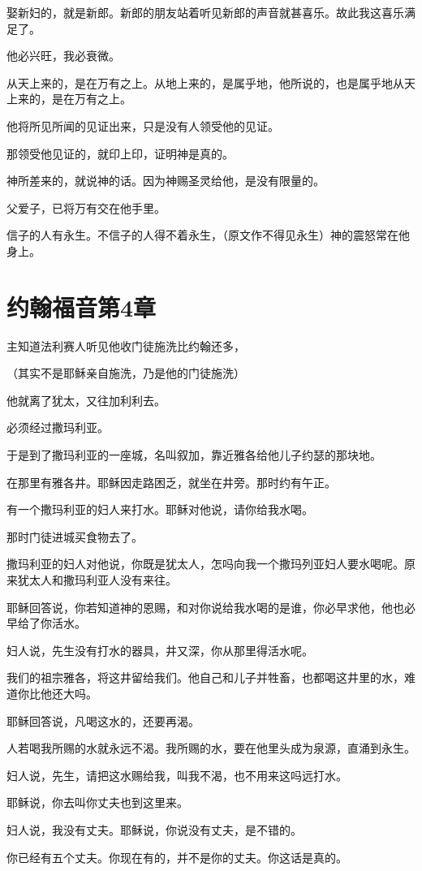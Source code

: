 \documentclass[12pt,oneside]{book}
\begin{document}
娶新妇的，就是新郎。新郎的朋友站着听见新郎的声音就甚喜乐。故此我这喜乐满足了。

他必兴旺，我必衰微。

从天上来的，是在万有之上。从地上来的，是属乎地，他所说的，也是属乎地从天上来的，是在万有之上。

他将所见所闻的见证出来，只是没有人领受他的见证。

那领受他见证的，就印上印，证明神是真的。

神所差来的，就说神的话。因为神赐圣灵给他，是没有限量的。

父爱子，已将万有交在他手里。

信子的人有永生。不信子的人得不着永生，（原文作不得见永生）神的震怒常在他身上。

\chapter{约翰福音第4章}
主知道法利赛人听见他收门徒施洗比约翰还多，

（其实不是耶稣亲自施洗，乃是他的门徒施洗）

他就离了犹太，又往加利利去。

必须经过撒玛利亚。

于是到了撒玛利亚的一座城，名叫叙加，靠近雅各给他儿子约瑟的那块地。

在那里有雅各井。耶稣因走路困乏，就坐在井旁。那时约有午正。

有一个撒玛利亚的妇人来打水。耶稣对他说，请你给我水喝。

那时门徒进城买食物去了。

撒玛利亚的妇人对他说，你既是犹太人，怎吗向我一个撒玛列亚妇人要水喝呢。原来犹太人和撒玛利亚人没有来往。

耶稣回答说，你若知道神的恩赐，和对你说给我水喝的是谁，你必早求他，他也必早给了你活水。

妇人说，先生没有打水的器具，井又深，你从那里得活水呢。

我们的祖宗雅各，将这井留给我们。他自己和儿子并牲畜，也都喝这井里的水，难道你比他还大吗。

耶稣回答说，凡喝这水的，还要再渴。

人若喝我所赐的水就永远不渴。我所赐的水，要在他里头成为泉源，直涌到永生。

妇人说，先生，请把这水赐给我，叫我不渴，也不用来这吗远打水。

耶稣说，你去叫你丈夫也到这里来。

妇人说，我没有丈夫。耶稣说，你说没有丈夫，是不错的。

你已经有五个丈夫。你现在有的，并不是你的丈夫。你这话是真的。
\end{document}

